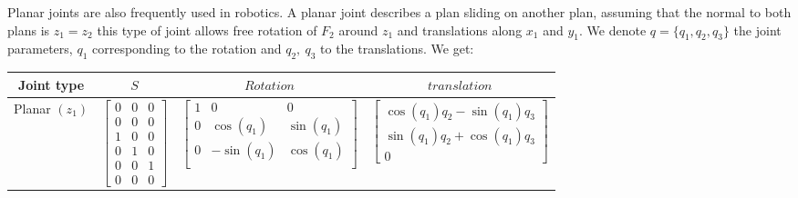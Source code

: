 Planar joints are also frequently used in robotics.
A planar joint describes a plan sliding on another plan, assuming that the normal to both plans is $z_1 = z_2$ this type of joint allows free rotation of $F_2$ around $z_1$ and translations along $x_1$ and $y_1$. We denote $q = \{q_1, q_2, q_3\}$ the joint parameters, $q_1$ corresponding to the rotation and $q_2,\ q_3$ to the translations. We get:

\begin{table} [ht]
\centering
\begin{tabular}{cccc}
  \toprule
  Joint type & $S$ & $Rotation$ & $translation$ \\
  \midrule
  Planar $(z_1)$
  &
  $\begin{bmatrix}
    0 & 0 & 0 \\ 0 & 0 & 0 \\ 1 & 0 & 0 \\ 0 & 1 & 0 \\ 0 & 0 & 1 \\ 0 & 0 & 0
  \end{bmatrix}$
  &
  $\begin{bmatrix}
    1 & 0 & 0 \\
    0 & \cos(q_1) & \sin(q_1) \\
    0 & -\sin(q_1) & \cos(q_1) \\
  \end{bmatrix}$
  &
  $\begin{bmatrix}
    \cos(q_1)q_2 - \sin(q_1)q_3 \\ \sin(q_1)q_2 + \cos(q_1)q_3 \\ 0
  \end{bmatrix}$
  \\
  \bottomrule
\end{tabular}
\end{table}

